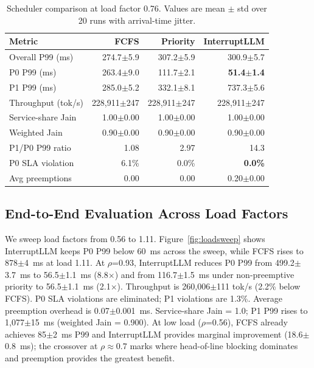 \documentclass[conference]{IEEEtran}
\begin{document}
\begin{table}[t]
\caption{Scheduler comparison at load factor 0.76. Values are mean $\pm$ std over 20 runs with arrival-time jitter.}
\label{tab:phase2}
\centering
\footnotesize
\setlength{\tabcolsep}{2.5pt}
\begin{tabular}{@{}lrrr@{}}
\toprule
\textbf{Metric} & \textbf{FCFS} & \textbf{Priority} & \textbf{InterruptLLM} \\
\midrule
Overall P99 (ms) & 274.7$\pm$5.9 & 307.2$\pm$5.9 & 300.9$\pm$5.7 \\
P0 P99 (ms) & 263.4$\pm$9.0 & 111.7$\pm$2.1 & \textbf{51.4$\pm$1.4} \\
P1 P99 (ms) & 285.0$\pm$5.2 & 332.1$\pm$8.1 & 737.3$\pm$5.6 \\
Throughput (tok/s) & 228,911$\pm$247 & 228,911$\pm$247 & 228,911$\pm$247 \\
Service-share Jain & 1.00$\pm$0.00 & 1.00$\pm$0.00 & 1.00$\pm$0.00 \\
Weighted Jain & 0.90$\pm$0.00 & 0.90$\pm$0.00 & 0.90$\pm$0.00 \\
P1/P0 P99 ratio & 1.08 & 2.97 & 14.3 \\
P0 SLA violation & 6.1\% & 0.0\% & \textbf{0.0\%} \\
Avg preemptions & 0.00 & 0.00 & 0.20$\pm$0.00 \\
\bottomrule
\end{tabular}
\end{table}

\subsection{End-to-End Evaluation Across Load Factors}

We sweep load factors from 0.56 to 1.11. Figure~\ref{fig:loadsweep} shows InterruptLLM keeps P0 P99 below 60~ms across the sweep, while FCFS rises to 878$\pm$4~ms at load 1.11. At $\rho$=0.93, InterruptLLM reduces P0 P99 from 499.2$\pm$3.7~ms to 56.5$\pm$1.1~ms (8.8$\times$) and from 116.7$\pm$1.5~ms under non-preemptive priority to 56.5$\pm$1.1~ms (2.1$\times$). Throughput is 260,006$\pm$111 tok/s (2.2\% below FCFS). P0 SLA violations are eliminated; P1 violations are 1.3\%. Average preemption overhead is 0.07$\pm$0.001~ms. Service-share Jain = 1.0; P1 P99 rises to 1,077$\pm$15~ms (weighted Jain = 0.900). At low load ($\rho$=0.56), FCFS already achieves 85$\pm$2~ms P99 and InterruptLLM provides marginal improvement (18.6$\pm$0.8~ms); the crossover at $\rho \approx 0.7$ marks where head-of-line blocking dominates and preemption provides the greatest benefit.
\end{document}
